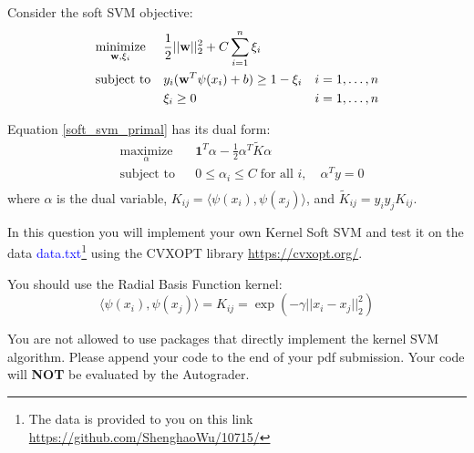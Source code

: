
Consider the soft SVM objective:
\begin{equation}
\label{soft_svm_primal}
\begin{aligned}
& \underset{\mathbf{w}, \xi_i}{\text{minimize}} && \frac{1}{2}||\mathbf{w}||_2^2 + C\sum_{i=1}^n\xi_i\\
& \text{subject to} && y_i(\mathbf{w}^T\psi(x_i) + b) \geq 1-\xi_i & i = 1,\ldots, n\\
& && \xi_i \geq 0 & i = 1,\ldots, n
\end{aligned}
\end{equation}

Equation \ref{soft_svm_primal} has its dual form:
\begin{equation}
\label{soft_svm_dual}
\begin{aligned} 
  & \underset{\alpha}{\text{maximize}} && \mathbf{1}^T\alpha - \frac{1}{2}\alpha^T \tilde{K}\alpha \\
  & \text{subject to} && 0\leq \alpha_i\leq C \; \text{for all } i, \quad \alpha^Ty = 0\\
\end{aligned}
\end{equation}
where $\alpha$ is the dual variable, $K_{ij} = \langle\psi(x_i), \psi(x_j)\rangle$, and $\tilde{K}_{ij} = y_iy_jK_{ij}$.

\vspace{5 mm}
In this question you will implement your own Kernel Soft SVM and test it on the data \textcolor{blue}{data.txt}\footnote{The data is provided to you on this link \url{https://github.com/ShenghaoWu/10715/}} using the CVXOPT library \url{https://cvxopt.org/}.

You should use the Radial Basis Function kernel:
$$\langle \psi(x_i), \psi(x_j) \rangle = K_{ij} = \exp\left(-\gamma||x_i - x_j||_2^2\right)$$



You are not allowed to use packages that directly implement the kernel SVM algorithm. Please append your code to the end of your pdf submission. Your code will \textbf{NOT} be evaluated by the Autograder.

\vspace{5mm}

